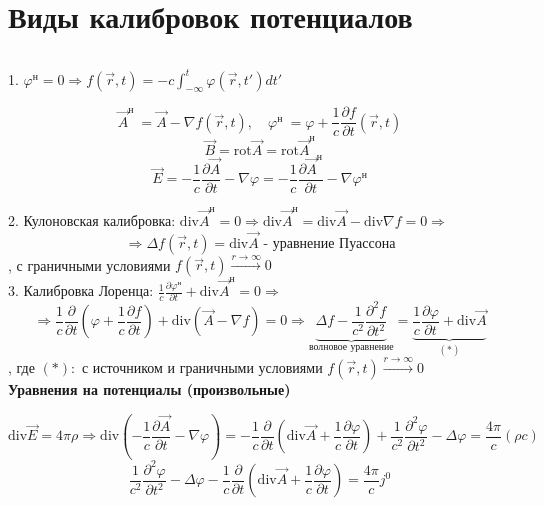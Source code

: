 \documentclass[12pt, a4paper]{report}
\begin{document}
\fi

\section{Виды калибровок потенциалов} \(  \) 

1. \( \displaystyle \varphi ^{\text{н} } = 0 \Rightarrow f (\vec{r }  , t )  = - c \int_{-\infty}^{t }  \varphi (\vec{ r }  , t ' ) d t '  \) 

\[ \vec{A }  ^{\text{н }  } = \vec{A }  - \nabla f (\vec{r }  , t ) , \quad \varphi ^{\text{н } }    = \varphi + \frac{1}{c }  \frac{\partial  f } {\partial  t } (\vec{ r }  , t ) \] 
\[ \vec{B } = \mathrm{rot } \vec{ A }  = \mathrm{rot }  \vec{ A } ^{\text{н} }      \] 
\[ \vec{E }  = -\frac{1}{c }  \frac{\partial  \vec{A } }{\partial  t } - \nabla \varphi = - \frac{1}{c }  \frac{\partial \vec{ A } ^{\text{н} } }{\partial  t } - \nabla \varphi ^{\text{н} }   \] 

2. Кулоновская калибровка: \( \displaystyle  \mathrm{div} \vec{ A }  ^{\text{н} } = 0 \Rightarrow \mathrm{ div } \vec{ A }  ^{\text{н} } = \mathrm{div }  \vec{ A }  - \mathrm{div }  \nabla f = 0 \Rightarrow         \) 
\[ \Rightarrow \Delta f (\vec{ r } , t ) = \mathrm{div} \vec{ A }  \text{ - уравнение Пуассона}  \] 
, с граничными условиями \( f (\vec{ r }  ,t ) \xrightarrow{ r \to  \infty  } 0   \) \\

3. Калибровка Лоренца: \( \displaystyle  \frac{1}{c } \frac{ \partial  \varphi ^{\text{н} } }{\partial  t } + \mathrm{ div } \vec{ A }  ^{\text{н} }  = 0 \Rightarrow      \) 
\[ \Rightarrow \frac{1}{c }  \frac{\partial}{\partial  t } \left( \varphi + \frac{1}{c }  \frac{\partial  f }{\partial  t }  \right) + \mathrm{ div }    (\vec{ A }  - \nabla f ) = 0 \Rightarrow\underbrace{ \Delta  f - \frac{1}{c ^2 } \frac{\partial  ^2 f }{\partial  t ^2 }}_{\text{волновое уравнение} } = \underbrace{\frac{1}{c }  \frac{\partial  \varphi }{\partial  t } + \mathrm{ div } \vec{ A } }_{(*)}     \] 
, где \( (*):  \)  с источником и граничными условиями \( f (\vec{ r }  ,t ) \xrightarrow{ r \to  \infty  } 0   \) \\ 

\textbf{Уравнения на потенциалы (произвольные)}

\[ \mathrm{div } \vec{E }  = 4 \pi \rho \Rightarrow \mathrm{div }  \left( -\frac{1}{c }  \frac{\partial  \vec{ A } }{\partial  t } - \nabla \varphi        \right) = -\frac{1}{c }  \frac{\partial  }{\partial  t } \left( \mathrm{div }  \vec{A }  +\frac{1}{c }  \frac{\partial  \varphi }{ \partial  t }   \right) + \frac{1}{c ^2 }\frac{\partial  ^2 \varphi  }{\partial  t ^2 } - \Delta \varphi = \frac{4\pi}{c }  (\rho c )       \] 
\[ \boxed{\frac{1}{c ^2 } \frac{\partial  ^2 \varphi }{\partial  t  ^2 } -\Delta \varphi -\frac{1}{c }  \frac{\partial  }{\partial  t } \left(  \mathrm{div }  \vec{ A }  + \frac{1}{c }  \frac{\partial  \varphi }{\partial  t }    \right) = \frac{4\pi}{c }  j^0  }  \] 
\end{document}
